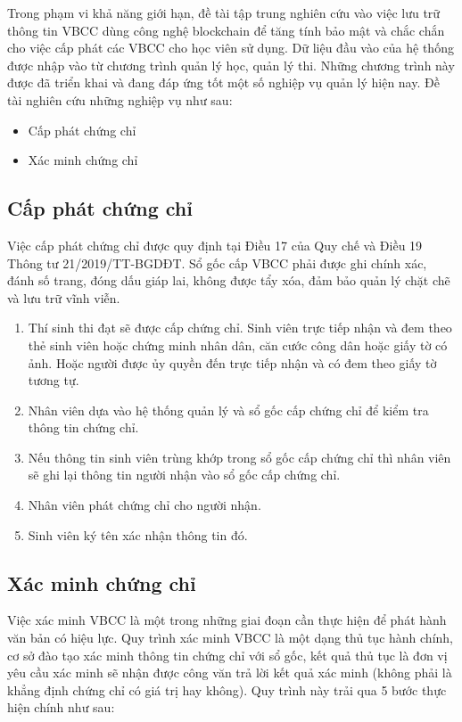 Trong phạm vi khả năng giới hạn, đề tài tập trung nghiên cứu vào việc lưu trữ thông tin VBCC dùng công nghệ blockchain để tăng tính bảo mật và chắc chắn cho việc cấp phát các VBCC cho học viên sử dụng. Dữ liệu đầu vào của hệ thống được nhập vào từ chương trình quản lý học, quản lý thi. Những chương trình này được đã triển khai và đang đáp ứng tốt một số nghiệp vụ quản lý hiện nay. Đề tài nghiên cứu những nghiệp vụ như sau:

\begin{itemize}
\item Cấp phát chứng chỉ
\item Xác minh chứng chỉ
\end{itemize}

\subsection{Cấp phát chứng chỉ}

Việc cấp phát chứng chỉ được quy định tại Điều 17 của Quy chế và Điều 19 Thông tư 21/2019/TT-BGDĐT. Sổ gốc cấp VBCC phải được ghi chính xác, đánh số trang, đóng dấu giáp lai, không được tẩy xóa, đảm bảo quản lý chặt chẽ và lưu trữ vĩnh viễn.

\begin{enumerate}
\item Thí sinh thi đạt sẽ được cấp chứng chỉ. Sinh viên trực tiếp nhận và đem theo thẻ sinh viên hoặc chứng minh nhân dân, căn cước công dân hoặc giấy tờ có ảnh. Hoặc người được ủy quyền đến trực tiếp nhận và có đem theo giấy tờ tương tự.
\item Nhân viên dựa vào hệ thống quản lý và sổ gốc cấp chứng chỉ để kiểm tra thông tin chứng chỉ.
\item Nếu thông tin sinh viên trùng khớp trong sổ gốc cấp chứng chỉ thì nhân viên sẽ ghi lại thông tin người nhận vào sổ gốc cấp chứng chỉ.
\item Nhân viên phát chứng chỉ cho người nhận.
\item Sinh viên ký tên xác nhận thông tin đó.
\end{enumerate}

\subsection{Xác minh chứng chỉ}

Việc xác minh VBCC là một trong những giai đoạn cần thực hiện để phát hành văn bản có hiệu lực. Quy trình xác minh VBCC là một dạng thủ tục hành chính, cơ sở đào tạo xác minh thông tin chứng chỉ với sổ gốc, kết quả thủ tục là đơn vị yêu cầu xác minh sẽ nhận được công văn trả lời kết quả xác minh (không phải là khẳng định chứng chỉ có giá trị hay không). Quy trình này trải qua 5 bước thực hiện chính như sau:

